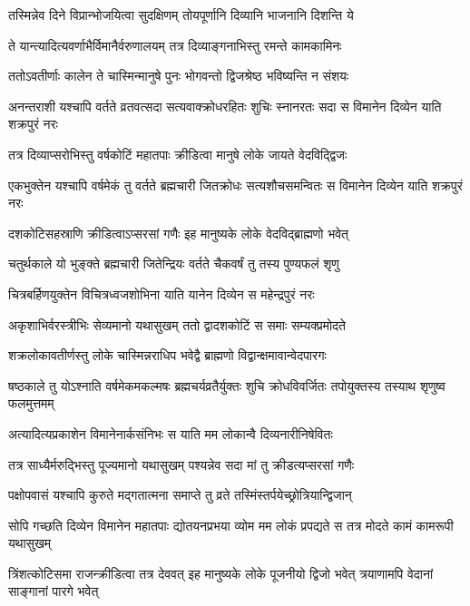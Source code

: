 \twolineshloka
{तस्मिन्नेव दिने विप्रान्भोजयित्वा सुदक्षिणम्}
{तोयपूर्णानि दिव्यानि भाजनानि दिशन्ति ये}


\twolineshloka
{ते यान्त्यादित्यवर्णाभैर्विमानैर्वरुणालयम्}
{तत्र दिव्याङ्गनाभिस्तु रमन्ते कामकामिनः}


\twolineshloka
{ततोऽवतीर्णाः कालेन ते चास्मिन्मानुषे पुनः}
{भोगवन्तो द्विजश्रेष्ठ भविष्यन्ति न संशयः}


\threelineshloka
{अनन्तराशी यश्चापि वर्तते व्रतवत्सदा}
{सत्यवाक्क्रोधरहितः शुचिः स्नानरतः सदा}
{स विमानेन दिव्येन याति शक्रपुरं नरः}


\twolineshloka
{तत्र दिव्याप्सरोभिस्तु वर्षकोटिं महातपाः}
{क्रीडित्वा मानुषे लोके जायते वेदविद्द्विजः}


\threelineshloka
{एकभुक्तेन यश्चापि वर्षमेकं तु वर्तते}
{ब्रह्मचारी जितक्रोधः सत्यशौचसमन्वितः}
{स विमानेन दिव्येन याति शक्रपुरं नरः}


\twolineshloka
{दशकोटिसहस्राणि क्रीडित्वाऽप्सरसां गणैः}
{इह मानुष्यके लोके वेदविद्ब्राह्मणो भवेत्}


\twolineshloka
{चतुर्थकाले यो भुङ्क्ते ब्रह्मचारी जितेन्द्रियः}
{वर्तते चैकवर्षं तु तस्य पुण्यफलं शृणु}


\twolineshloka
{चित्रबर्हिणयुक्तेन विचित्रध्वजशोभिना}
{याति यानेन दिव्येन स महेन्द्रपुरं नरः}


\twolineshloka
{अकृशाभिर्वरस्त्रीभिः सेव्यमानो यथासुखम्}
{ततो द्वादशकोटिं स समाः सम्यक्प्रमोदते}


\twolineshloka
{शक्रलोकावतीर्णस्तु लोके चास्मिन्नराधिप}
{भवेद्वै ब्राह्मणो विद्वान्क्षमावान्वेदपारगः}


\threelineshloka
{षष्ठकाले तु योऽश्नाति वर्षमेकमकल्मषः}
{ब्रह्मचर्यव्रतैर्युक्तः शुचि क्रोधविवर्जितः}
{तपोयुक्तस्य तस्याथ शृणुष्व फलमुत्तमम्}


\twolineshloka
{अत्यादित्यप्रकाशेन विमानेनार्कसंनिभः}
{स याति मम लोकान्वै दिव्यनारीनिषेवितः}


\twolineshloka
{तत्र साध्यैर्मरुद्भिस्तु पूज्यमानो यथासुखम्}
{पश्यन्नेव सदा मां तु क्रीडत्यप्सरसां गणैः}


\twolineshloka
{पक्षोपवासं यश्चापि कुरुते मद्गतात्मना}
{समाप्ते तु व्रते तस्मिंस्तर्पयेच्छ्रोत्रियान्द्विजान्}


\threelineshloka
{सोपि गच्छति दिव्येन विमानेन महातपाः}
{द्योतयनप्रभया व्योम मम लोकं प्रपद्यते}
{स तत्र मोदते कामं कामरूपी यथासुखम्}


\threelineshloka
{त्रिंशत्कोटिसमा राजन्क्रीडित्वा तत्र देववत्}
{इह मानुष्यके लोके पूजनीयो द्विजो भवेत्}
{त्रयाणामपि वेदानां साङ्गानां पारगे भवेत्}


